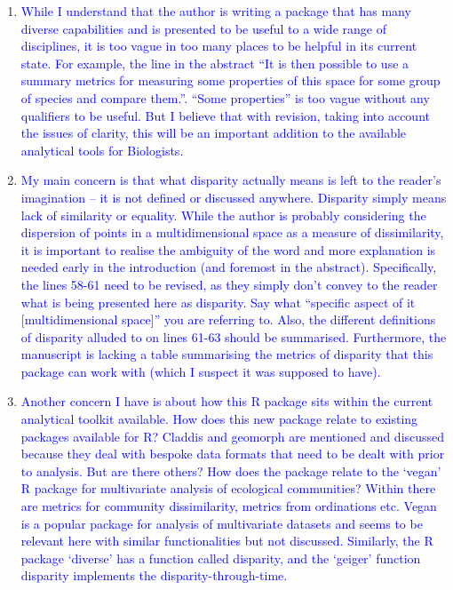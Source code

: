\documentclass[12pt,letterpaper]{article}
\begin{document}
\begin{enumerate}

\item{\textcolor{blue}{While I understand that the author is writing a package that has many diverse capabilities and is presented to be useful to a wide range of disciplines, it is too vague in too many places to be helpful in its current state.
For example, the line in the abstract “It is then possible to use a summary metrics for measuring some properties of this space for some group of species and compare them.”.
“Some properties” is too vague without any qualifiers to be useful. But I believe that with revision, taking into account the issues of clarity, this will be an important addition to the available analytical tools for Biologists.}}


\item{\textcolor{blue}{My main concern is that what disparity actually means is left to the reader’s imagination – it is not defined or discussed anywhere.
Disparity simply means lack of similarity or equality. While the author is probably considering the dispersion of points in a multidimensional space as a measure of dissimilarity, it is important to realise the ambiguity of the word and more explanation is needed early in the introduction (and foremost in the abstract).
Specifically, the lines 58-61 need to be revised, as they simply don’t convey to the reader what is being presented here as disparity.
Say what “specific aspect of it [multidimensional space]” you are referring to.
Also, the different definitions of disparity alluded to on lines 61-63 should be summarised.
Furthermore, the manuscript is lacking a table summarising the metrics of disparity that this package can work with (which I suspect it was supposed to have).}}


\item{\textcolor{blue}{Another concern I have is about how this R package sits within the current analytical toolkit available.
How does this new package relate to existing packages available for R?
Claddis and geomorph are mentioned and discussed because they deal with bespoke data formats that need to be dealt with prior to analysis.
But are there others?
How does the package relate to the ‘vegan’ R package for multivariate analysis of ecological communities?
Within there are metrics for community dissimilarity, metrics from ordinations etc.
Vegan is a popular package for analysis of multivariate datasets and seems to be relevant here with similar functionalities but not discussed.
Similarly, the R package ‘diverse’ has a function called disparity, and the ‘geiger’ function disparity implements the disparity-through-time. }}


\end{enumerate}
\end{document}
